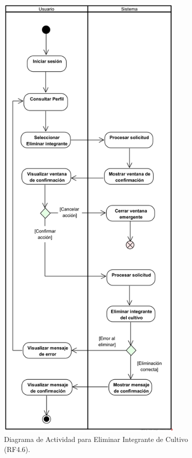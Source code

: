 \begin{figure}[H]
	\centering
	\caption{Diagrama de Actividad para Eliminar Integrante de Cultivo (RF4.6).}
 \includegraphics[width=0.8\textwidth]{UML/Actividad/Diagrama de Actividad RF4.6 Eliminar Integrante Cultivo.png}
\end{figure}

